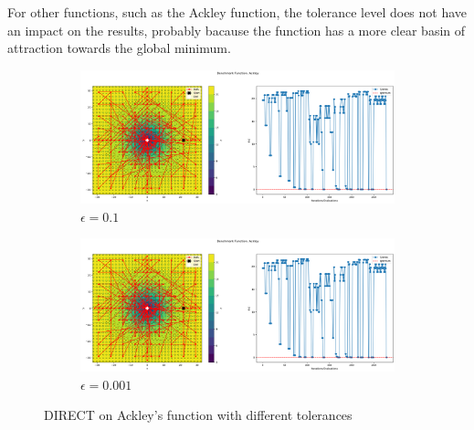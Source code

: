 For other functions, such as the Ackley function, the tolerance level does not have an impact on the results, probably bacause the function has a more clear basin of attraction towards the global minimum.
\begin{figure}[H]
    \begin{subfigure}{0.5\textwidth}
        \includegraphics[width=\textwidth]{lab2/imgs/di_ackley_eps_01.png}
        \caption{$\epsilon =0.1$}
    \end{subfigure}
    \begin{subfigure}{0.5\textwidth}
        \includegraphics[width=\textwidth]{lab2/imgs/di_ackley_eps_001.png}
        \caption{$\epsilon =0.001$}
    \end{subfigure}
    \caption{DIRECT on Ackley's function with different tolerances}
    \label{fig:ackley-tolerance}
\end{figure}

